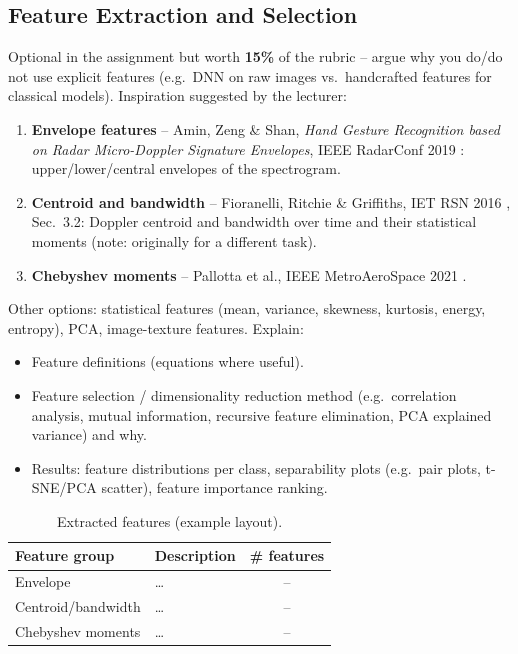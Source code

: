 \documentclass[10pt,a4paper,titlepage]{article}
\newcommand{\placeholder}[1]{\begin{placeholderbox}#1\end{placeholderbox}}
\begin{document}
\subsection{Feature Extraction and Selection}
\placeholder{%
Optional in the assignment but worth \textbf{15\%} of the rubric -- argue why
you do/do not use explicit features (e.g.\ DNN on raw images vs.\ handcrafted
features for classical models). Inspiration suggested by the lecturer:
\begin{enumerate}
  \item \textbf{Envelope features} -- Amin, Zeng \& Shan, \emph{Hand Gesture
        Recognition based on Radar Micro-Doppler Signature Envelopes}, IEEE
        RadarConf 2019 \cite{amin2019}: upper/lower/central envelopes of the
        spectrogram.
  \item \textbf{Centroid and bandwidth} -- Fioranelli, Ritchie \& Griffiths,
        IET RSN 2016 \cite{fioranelli2016}, Sec.~3.2: Doppler centroid and
        bandwidth over time and their statistical moments (note: originally for
        a different task).
  \item \textbf{Chebyshev moments} -- Pallotta et al., IEEE MetroAeroSpace 2021
        \cite{pallotta2021}.
\end{enumerate}
Other options: statistical features (mean, variance, skewness, kurtosis,
energy, entropy), PCA, image-texture features. Explain:
\begin{itemize}
  \item Feature definitions (equations where useful).
  \item Feature selection / dimensionality reduction method (e.g.\ correlation
        analysis, mutual information, recursive feature elimination, PCA
        explained variance) and why.
  \item Results: feature distributions per class, separability plots
        (e.g.\ pair plots, t-SNE/PCA scatter), feature importance ranking.
\end{itemize}}

\begin{table}[h]
  \centering
  \caption{Extracted features (example layout).}
  \label{tab:features}
  \begin{tabular}{@{}llc@{}}
    \toprule
    Feature group & Description & \# features \\
    \midrule
    Envelope        & \ldots & -- \\
    Centroid/bandwidth & \ldots & -- \\
    Chebyshev moments  & \ldots & -- \\
    \bottomrule
  \end{tabular}
\end{table}
\end{document}
